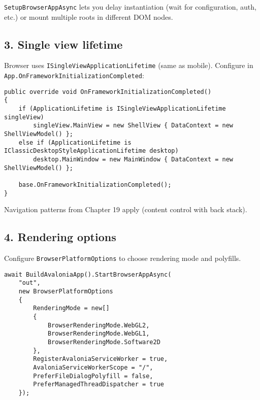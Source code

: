 \passthrough{\lstinline!SetupBrowserAppAsync!} lets you delay
instantiation (wait for configuration, auth, etc.) or mount multiple
roots in different DOM nodes.

\subsection{3. Single view lifetime}\label{single-view-lifetime-1}

Browser uses \passthrough{\lstinline!ISingleViewApplicationLifetime!}
(same as mobile). Configure in
\passthrough{\lstinline!App.OnFrameworkInitializationCompleted!}:

\begin{lstlisting}
public override void OnFrameworkInitializationCompleted()
{
    if (ApplicationLifetime is ISingleViewApplicationLifetime singleView)
        singleView.MainView = new ShellView { DataContext = new ShellViewModel() };
    else if (ApplicationLifetime is IClassicDesktopStyleApplicationLifetime desktop)
        desktop.MainWindow = new MainWindow { DataContext = new ShellViewModel() };

    base.OnFrameworkInitializationCompleted();
}
\end{lstlisting}

Navigation patterns from Chapter 19 apply (content control with back
stack).

\subsection{4. Rendering options}\label{rendering-options}

Configure \passthrough{\lstinline!BrowserPlatformOptions!} to choose
rendering mode and polyfills.

\begin{lstlisting}
await BuildAvaloniaApp().StartBrowserAppAsync(
    "out",
    new BrowserPlatformOptions
    {
        RenderingMode = new[]
        {
            BrowserRenderingMode.WebGL2,
            BrowserRenderingMode.WebGL1,
            BrowserRenderingMode.Software2D
        },
        RegisterAvaloniaServiceWorker = true,
        AvaloniaServiceWorkerScope = "/",
        PreferFileDialogPolyfill = false,
        PreferManagedThreadDispatcher = true
    });
\end{lstlisting}

